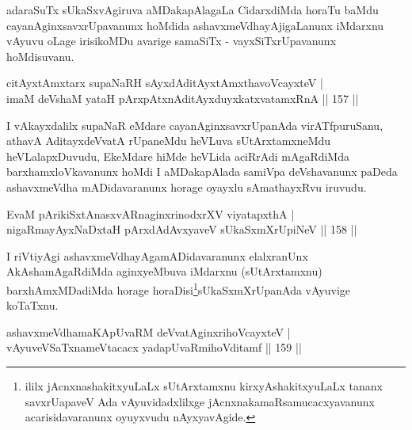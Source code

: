 \begin{artha}
adaraSuTx sUkaSxvAgiruva aMDakapAlagaLa CidarxdiMda horaTu baMdu cayanAginxsavxrUpavanunx hoMdida ashavxmeVdhayAjigaLanunx iMdarxnu vAyuvu oLage irisikoMDu avarige samaSiTx - vayxSiTxrUpavanunx hoMdisuvanu.
\end{artha}


\begin{shl}
citAyxtAmx\s tarx supaNaRH sAyxdAditAyxtAmx\s thavoVcayxteV |\\
imaM deVshaM yataH pArxpAtxnAditAyxduyxkatxvatamxRnA \hfill || 157 ||
\end{shl}

\begin{artha}
I vAkayxdalilx supaNaR eMdare cayanAginxsavxrUpanAda virATfpuruSanu, athavA AditayxdeVvatA rUpaneMdu heVLuva sUtArxtamxneMdu heVLalapxDuvudu, EkeMdare hiMde heVLida aciRrAdi mAgaRdiMda barxhamxloVkavanunx hoMdi I aMDakapAlada samiVpa deVshavanunx paDeda ashavxmeVdha mADidavaranunx horage oyayxlu sAmathayxRvu iruvudu.
\end{artha}

\begin{shl}
\footnotemark{}EvaM pArikiSxtAnasxvARnaginxrinodxrXV viyatapxthA |\\
nigaRmayAyxNaDxtaH pArxdAdAvxyaveV sUkaSxmXrUpiNeV \hfill || 158 ||
\end{shl}

\begin{artha}
I riVtiyAgi ashavxmeVdhayAgamADidavaranunx elalxranUnx AkAshamAgaRdiMda aginxyeMbuva iMdarxnu (sUtArxtamxnu) barxhAmxMDadiMda horage horaDisi\footnote{ililx jAcnxnashakitxyuLaLx sUtArxtamxnu kirxyAshakitxyuLaLx tananx savxrUapaveV Ada vAyuvidadxlilxge jAcnxnakamaRsamucacxyavanunx acarisidavaranunx oyuyxvudu nAyxyavAgide.}sUkaSxmXrUpanAda vAyuvige koTaTxnu.
\end{artha}


\begin{shl}
ashavxmeVdhamaKApUvaRM deVvatA\s ginxrihoVcayxteV |\\
vAyuveVSaTxnameVtacacx yadapUvaRmihoVditamf \hfill || 159 ||
\end{shl}

